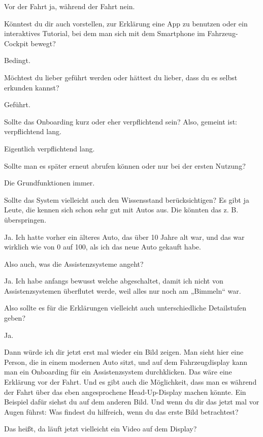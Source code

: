 Vor der Fahrt ja, während der Fahrt nein.

\interviewerin
Könntest du dir auch vorstellen, zur Erklärung eine App zu benutzen
oder ein interaktives Tutorial, bei dem man sich mit dem Smartphone im
Fahrzeug-Cockpit bewegt?

Bedingt.

\interviewerin
Möchtest du lieber geführt werden oder hättest du lieber, dass du es
selbst erkunden kannst?

Geführt.

\interviewerin
Sollte das Onboarding kurz oder eher verpflichtend sein? Also, gemeint
ist: verpflichtend lang.

Eigentlich verpflichtend lang.

\interviewerin
Sollte man es später erneut abrufen können oder nur bei der ersten
Nutzung?

Die Grundfunktionen immer.

\interviewerin
Sollte das System vielleicht auch den Wissensstand berücksichtigen? Es
gibt ja Leute, die kennen sich schon sehr gut mit Autos aus. Die
könnten das z. B. überspringen.

Ja. Ich hatte vorher ein älteres Auto, das über 10 Jahre alt war, und
das war wirklich wie von 0 auf 100, als ich das neue Auto gekauft habe.

\interviewerin
Also auch, was die Assistenzsysteme angeht?

Ja. Ich habe anfangs bewusst welche abgeschaltet, damit ich nicht von
Assistenzsystemen überflutet werde, weil alles nur noch am „Bimmeln“
war.

\interviewerin
Also sollte es für die Erklärungen vielleicht auch unterschiedliche
Detailstufen geben?

Ja.

\interviewerin
Dann würde ich dir jetzt erst mal wieder ein Bild zeigen. Man sieht hier
eine Person, die in einem modernen Auto sitzt, und auf dem
Fahrzeugdisplay kann man ein Onboarding für ein Assistenzsystem
durchklicken. Das wäre eine Erklärung vor der Fahrt. Und es gibt auch
die Möglichkeit, dass man es während der Fahrt über das eben
angesprochene Head-Up-Display machen könnte. Ein Beispiel dafür siehst
du auf dem anderen Bild. Und wenn du dir das jetzt mal vor Augen führst:
Was findest du hilfreich, wenn du das erste Bild betrachtest?

Das heißt, da läuft jetzt vielleicht ein Video auf dem Display?

